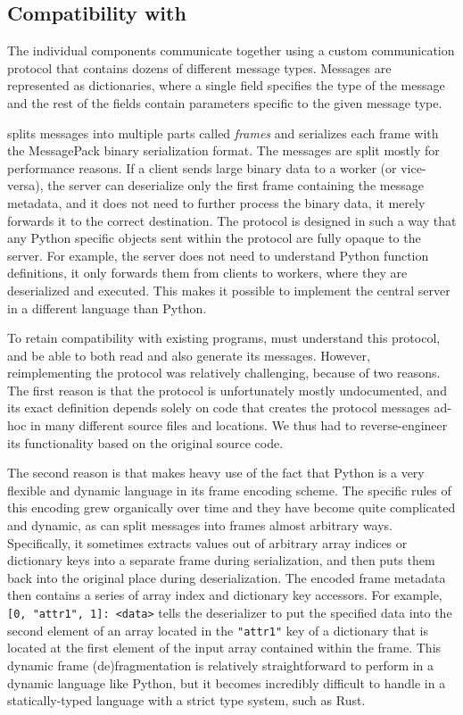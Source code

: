 \subsection*{Compatibility with \dask{}}
The individual \dask{} components communicate together using a custom
communication protocol that contains dozens of different message types. Messages are represented as
dictionaries, where a single field specifies the type of the message and the rest of the fields
contain parameters specific to the given message type.

\dask{} splits messages into multiple parts called \emph{frames}
and serializes each frame with the MessagePack binary serialization
format. The messages are split mostly for performance reasons. If a client sends large binary data
to a worker (or vice-versa), the server can deserialize only the first frame containing the message
metadata, and it does not need to further process the binary data, it merely forwards it to the
correct destination. The protocol is designed in such a way that any Python specific objects sent
within the protocol are fully opaque to the server. For example, the server does not need to
understand Python function definitions, it only forwards them from clients to workers, where they
are deserialized and executed. This makes it possible to implement the central server in a
different language than Python.

To retain compatibility with existing \dask{} programs,
\rsds{} must understand this protocol, and be able to both read and also
generate its messages. However, reimplementing the protocol was relatively challenging, because of
two reasons. The first reason is that the protocol is unfortunately mostly
undocumented, and its exact definition depends solely on
\dask{} code that creates the protocol messages ad-hoc in many different source
files and locations. We thus had to reverse-engineer its functionality based on the original
\dask{} source code.

The second reason is that \dask{} makes heavy use of the fact that Python is a
very flexible and dynamic language in its frame encoding scheme. The specific rules of this
encoding grew organically over time and they have become quite complicated and dynamic, as
\dask{} can split messages into frames almost arbitrary ways. Specifically, it
sometimes extracts values out of arbitrary array indices or dictionary keys into a separate frame
during serialization, and then puts them back into the original place during deserialization. The
encoded frame metadata then contains a series of array index and dictionary key accessors. For
example, \verb|[0, "attr1", 1]: <data>| tells the deserializer to put the specified data into the
second element of an array located in the \texttt{"attr1"} key of a dictionary that is
located at the first element of the input array contained within the frame. This dynamic frame
(de)fragmentation is relatively straightforward to perform in a dynamic language like Python, but
it becomes incredibly difficult to handle in a statically-typed language with a strict type system,
such as Rust.

